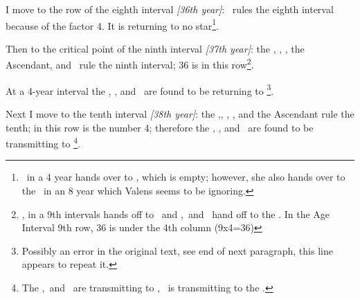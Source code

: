 I move to the row of the eighth interval \textsl{[36th year]}: \Venus\, rules the eighth interval because of the factor 4. It is returning to no star\footnote{\Venus\, in a 4 year hands over to \Aries, which is empty; however, she also hands over to the \Moon\, in an 8 year which Valens seems to be ignoring.}. 

Then to the critical point of the ninth interval \textsl{[37th year]}: the \Sun, \Mars, \Mercury, the Ascendant, and \Venus\, rule the ninth interval; 36 is in this row\footnote{\Venus, in a 9th intervals hands off to \Saturn\, and \Mercury,\Sun\, and \Mars\, hand off to the \Moon. In the Age Interval 9th row, 36 is under the 4th column (9x4=36)}.

At a 4-year interval the \Sun, \Jupiter, and \Mercury\, are found to be returning to \Saturn\footnote{Possibly an error in the original text, see end of next paragraph, this line appears to repeat it.}. 

Next I move to the tenth interval \textsl{[38th year]}: the \Sun,\Mars, \Mercury, \Jupiter, and the Ascendant rule the tenth; in this row is the number 4; therefore the \Sun, \Mercury, and \Jupiter\, are found to be transmitting to \Saturn\footnote{The \Sun,\Mercury\, and \Mars\, are transmitting to \Saturn, \Jupiter\, is transmitting to the \Moon.}.

